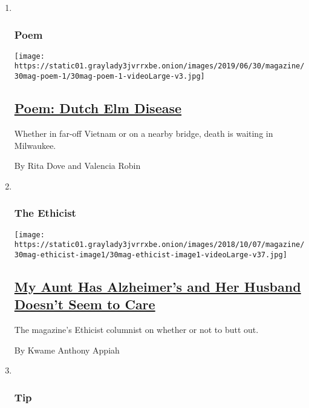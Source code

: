 \begin{enumerate}
\def\labelenumi{\arabic{enumi}.}
\item ~
  \hypertarget{poem}{%
  \subsubsection{Poem}\label{poem}}

  \texttt{[image: https://static01.graylady3jvrrxbe.onion/images/2019/06/30/magazine/30mag-poem-1/30mag-poem-1-videoLarge-v3.jpg]}

  \hypertarget{poem-dutch-elm-disease}{%
  \subsection{\texorpdfstring{\href{/2019/06/27/magazine/poem-dutch-elm-disease.html}{Poem:
  Dutch Elm
  Disease}}{Poem: Dutch Elm Disease}}\label{poem-dutch-elm-disease}}

  Whether in far-off Vietnam or on a nearby bridge, death is waiting in
  Milwaukee.

  By Rita Dove and Valencia Robin
\item ~
  \hypertarget{the-ethicist}{%
  \subsubsection{The Ethicist}\label{the-ethicist}}

  \texttt{[image: https://static01.graylady3jvrrxbe.onion/images/2018/10/07/magazine/30mag-ethicist-image1/30mag-ethicist-image1-videoLarge-v37.jpg]}

  \hypertarget{my-aunt-has-alzheimers-and-her-husband-doesnt-seem-to-care}{%
  \subsection{\texorpdfstring{\href{/2019/06/25/magazine/alzheimers-family-ethics-jobs.html}{My
  Aunt Has Alzheimer's and Her Husband Doesn't Seem to
  Care}}{My Aunt Has Alzheimer's and Her Husband Doesn't Seem to Care}}\label{my-aunt-has-alzheimers-and-her-husband-doesnt-seem-to-care}}

  The magazine's Ethicist columnist on whether or not to butt out.

  By Kwame Anthony Appiah
\item ~
  \hypertarget{tip}{%
  \subsubsection{Tip}\label{tip}}


\end{enumerate}

